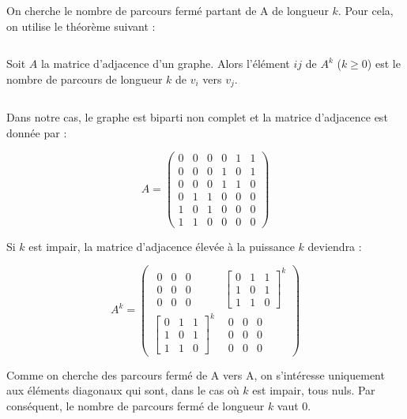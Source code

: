 \begin{solution}
On cherche le nombre de parcours fermé partant de A de longueur $k$.
Pour cela, on utilise le théorème suivant :

$\,$

Soit $A$ la matrice d'adjacence d'un graphe. Alors l'élément $ij$
de $A^{k}$ ($k\geq0$) est le nombre de parcours de longueur $k$
de $v_{i}$ vers $v_{j}$.

$\,$

Dans notre cas, le graphe est biparti non complet et la matrice d'adjacence
est donnée par :

\[
A=\left(\begin{array}{cccccc}
0 & 0 & 0 & 0 & 1 & 1\\
0 & 0 & 0 & 1 & 0 & 1\\
0 & 0 & 0 & 1 & 1 & 0\\
0 & 1 & 1 & 0 & 0 & 0\\
1 & 0 & 1 & 0 & 0 & 0\\
1 & 1 & 0 & 0 & 0 & 0
\end{array}\right)
\]


Si $k$ est impair, la matrice d'adjacence élevée à la puissance $k$
deviendra :

\[
A^{k}=\left(\begin{array}{cc}
\begin{array}{ccc}
0 & 0 & 0\\
0 & 0 & 0\\
0 & 0 & 0
\end{array} & \left[\begin{array}{ccc}
0 & 1 & 1\\
1 & 0 & 1\\
1 & 1 & 0
\end{array}\right]^{k}\\
\left[\begin{array}{ccc}
0 & 1 & 1\\
1 & 0 & 1\\
1 & 1 & 0
\end{array}\right]^{k} & \begin{array}{ccc}
0 & 0 & 0\\
0 & 0 & 0\\
0 & 0 & 0
\end{array}
\end{array}\right)
\]


Comme on cherche des parcours fermé de A vers A, on s'intéresse uniquement
aux éléments diagonaux qui sont, dans le cas où $k$ est impair, tous
nuls. Par conséquent, le nombre de parcours fermé de longueur $k$
vaut 0.


\end{solution}
